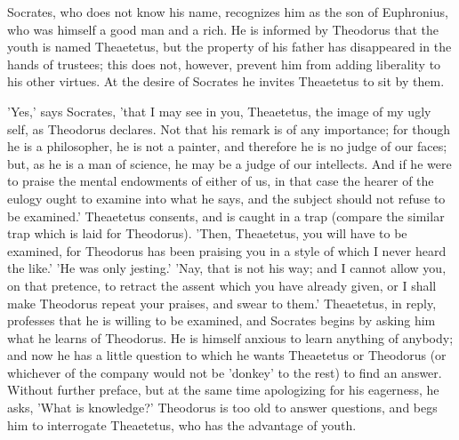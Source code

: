 \documentclass[11pt,letter]{article}
\begin{document}
\par  Socrates, who does not know his name, recognizes him as the son of Euphronius, who was himself a good man and a rich. He is informed by Theodorus that the youth is named Theaetetus, but the property of his father has disappeared in the hands of trustees; this does not, however, prevent him from adding liberality to his other virtues. At the desire of Socrates he invites Theaetetus to sit by them.

\par  'Yes,' says Socrates, 'that I may see in you, Theaetetus, the image of my ugly self, as Theodorus declares. Not that his remark is of any importance; for though he is a philosopher, he is not a painter, and therefore he is no judge of our faces; but, as he is a man of science, he may be a judge of our intellects. And if he were to praise the mental endowments of either of us, in that case the hearer of the eulogy ought to examine into what he says, and the subject should not refuse to be examined.' Theaetetus consents, and is caught in a trap (compare the similar trap which is laid for Theodorus). 'Then, Theaetetus, you will have to be examined, for Theodorus has been praising you in a style of which I never heard the like.' 'He was only jesting.' 'Nay, that is not his way; and I cannot allow you, on that pretence, to retract the assent which you have already given, or I shall make Theodorus repeat your praises, and swear to them.' Theaetetus, in reply, professes that he is willing to be examined, and Socrates begins by asking him what he learns of Theodorus. He is himself anxious to learn anything of anybody; and now he has a little question to which he wants Theaetetus or Theodorus (or whichever of the company would not be 'donkey' to the rest) to find an answer. Without further preface, but at the same time apologizing for his eagerness, he asks, 'What is knowledge?' Theodorus is too old to answer questions, and begs him to interrogate Theaetetus, who has the advantage of youth.
\end{document}
